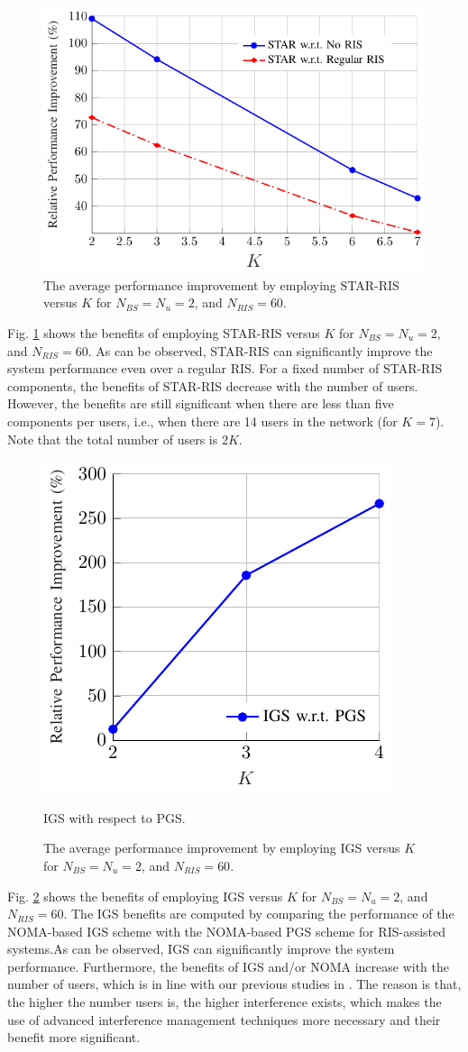 \documentclass[a4, conference]{IEEEtran}
\theoremstyle{definition}
\begin{document}
\begin{figure}[t!]
    \centering
       \includegraphics[width=.45\textwidth]{ris}
    \caption{The average performance improvement by employing STAR-RIS versus $K$ for $N_{BS}=N_u=2$, and $N_{RIS}=60$.}
	\label{Fig-ris} 
\end{figure}
Fig. \ref{Fig-ris} shows the benefits of employing STAR-RIS versus $K$ for $N_{BS}=N_u=2$, and $N_{RIS}=60$. As can be observed,  STAR-RIS can significantly improve the system performance even over a regular RIS. For a fixed number of STAR-RIS components, the benefits of STAR-RIS decrease with the number of users. However, the benefits are still significant when there are less than five components per users, i.e., when there are 14 users in the network (for $K=7$). Note that the total number of users is $2K$.


\begin{figure}[t!]
    \centering
       \includegraphics[width=.3\textwidth]{igs}
\caption{IGS with respect to PGS.}
    \caption{The average performance improvement by employing IGS versus $K$ for $N_{BS}=N_u=2$, and $N_{RIS}=60$.}
	\label{Fig-igs} 
\end{figure}
Fig. \ref{Fig-igs} shows the benefits of employing IGS %
versus $K$ for $N_{BS}=N_u=2$, and $N_{RIS}=60$. The IGS benefits are computed by comparing the performance of the NOMA-based IGS scheme with the NOMA-based PGS scheme for RIS-assisted systems.As can be observed, IGS %
can significantly improve the system performance. Furthermore, the   benefits of IGS and/or NOMA increase with the number of users, which is in line with our previous studies in \cite{soleymani2020improper, soleymani2022noma}.
The reason is that, the higher the number users is, the higher interference exists, which makes the use of advanced interference management techniques more necessary and their benefit more significant.
\end{document}
